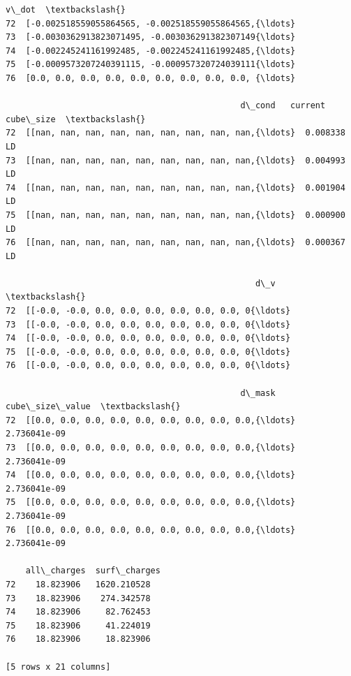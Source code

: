 \documentclass[11pt]{article}
\begin{document}
\begin{tcolorbox}[breakable, size=fbox, boxrule=.5pt, pad at break*=1mm, opacityfill=0]
\begin{Verbatim}[commandchars=\\\{\}]
                                                v\_dot  \textbackslash{}
72  [-0.002518559055864565, -0.002518559055864565,{\ldots}
73  [-0.0030362913823071495, -0.003036291382307149{\ldots}
74  [-0.002245241161992485, -0.002245241161992485,{\ldots}
75  [-0.0009573207240391115, -0.000957320724039111{\ldots}
76  [0.0, 0.0, 0.0, 0.0, 0.0, 0.0, 0.0, 0.0, 0.0, {\ldots}

                                               d\_cond   current  cube\_size  \textbackslash{}
72  [[nan, nan, nan, nan, nan, nan, nan, nan, nan,{\ldots}  0.008338         LD
73  [[nan, nan, nan, nan, nan, nan, nan, nan, nan,{\ldots}  0.004993         LD
74  [[nan, nan, nan, nan, nan, nan, nan, nan, nan,{\ldots}  0.001904         LD
75  [[nan, nan, nan, nan, nan, nan, nan, nan, nan,{\ldots}  0.000900         LD
76  [[nan, nan, nan, nan, nan, nan, nan, nan, nan,{\ldots}  0.000367         LD

                                                  d\_v  \textbackslash{}
72  [[-0.0, -0.0, 0.0, 0.0, 0.0, 0.0, 0.0, 0.0, 0{\ldots}
73  [[-0.0, -0.0, 0.0, 0.0, 0.0, 0.0, 0.0, 0.0, 0{\ldots}
74  [[-0.0, -0.0, 0.0, 0.0, 0.0, 0.0, 0.0, 0.0, 0{\ldots}
75  [[-0.0, -0.0, 0.0, 0.0, 0.0, 0.0, 0.0, 0.0, 0{\ldots}
76  [[-0.0, -0.0, 0.0, 0.0, 0.0, 0.0, 0.0, 0.0, 0{\ldots}

                                               d\_mask cube\_size\_value  \textbackslash{}
72  [[0.0, 0.0, 0.0, 0.0, 0.0, 0.0, 0.0, 0.0, 0.0,{\ldots}    2.736041e-09
73  [[0.0, 0.0, 0.0, 0.0, 0.0, 0.0, 0.0, 0.0, 0.0,{\ldots}    2.736041e-09
74  [[0.0, 0.0, 0.0, 0.0, 0.0, 0.0, 0.0, 0.0, 0.0,{\ldots}    2.736041e-09
75  [[0.0, 0.0, 0.0, 0.0, 0.0, 0.0, 0.0, 0.0, 0.0,{\ldots}    2.736041e-09
76  [[0.0, 0.0, 0.0, 0.0, 0.0, 0.0, 0.0, 0.0, 0.0,{\ldots}    2.736041e-09

    all\_charges  surf\_charges
72    18.823906   1620.210528
73    18.823906    274.342578
74    18.823906     82.762453
75    18.823906     41.224019
76    18.823906     18.823906

[5 rows x 21 columns]
\end{Verbatim}
\end{tcolorbox}
        
\end{document}
